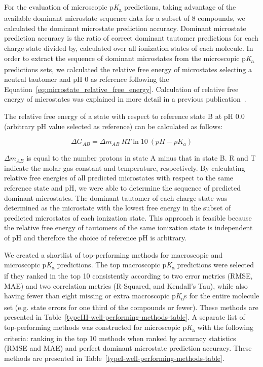 \documentclass[9pt,lineno,final]{elife}
\newcommand{\pKa}{p\textit{K}\textsubscript{a}}
\begin{document}
For the evaluation of microscopic \pKa{} predictions, taking advantage of the available dominant microstate sequence data for a subset of 8 compounds, we calculated the dominant microstate prediction accuracy. Dominant microstate prediction accuracy is the ratio of correct dominant tautomer predictions for each charge state divided by, calculated over all ionization states of each molecule. 
In order to extract the sequence of dominant microstates from the microscopic \pKa{} predictions sets, we calculated the relative free energy of microstates selecting a neutral tautomer and pH 0 as reference following the Equation~\ref{eq:microstate_relative_free_energy}. Calculation of relative free energy of microstates was explained in more detail in a previous publication~\citep{Gunner:2020:J.Comput.AidedMol.Des.}. 

The relative free energy of a state with respect to reference state B at pH 0.0 (arbitrary pH value selected as reference) can be calculated as follows: 

\begin{equation}
\Delta G_{AB} = \Delta m_{AB} \:RT\ln{10}\:(pH - pK_{a})
\label{eq:microstate_relative_free_energy}
\end{equation}

$\Delta m_{AB}$ is equal to the number protons in state A minus that in state B. R and T indicate the molar gas constant and temperature, respectively. 
By calculating relative free energies of all predicted microstates with respect to the same reference state and pH, we were able to determine the sequence of predicted dominant microstates. 
The dominant tautomer of each charge state was determined as the microstate with the lowest free energy in the subset of predicted microstates of each ionization state. 
This approach is feasible because the relative free energy of tautomers of the same ionization state is independent of pH and therefore the choice of reference pH is arbitrary.

We created a shortlist of top-performing methods for macroscopic and microscopic \pKa{} predictions. The top macroscopic \pKa{} predictions were selected if they ranked in the top 10 consistently according to two error metrics (RMSE, MAE) and two correlation metrics (R-Squared, and Kendall’s Tau), while also having fewer than eight missing or extra macroscopic \pKa{}s for the entire molecule set (e.g. state errors for one third of the compounds or fewer). 
These methods are presented in Table~\ref{typeIII-well-performing-methods-table}. A separate list of top-performing methods was constructed for microscopic \pKa{} with the following criteria: ranking in the top 10 methods when ranked by accuracy statistics (RMSE and MAE) and perfect dominant microstate prediction accuracy. These methods are presented in Table~\ref{typeI-well-performing-methods-table}.
\end{document}
